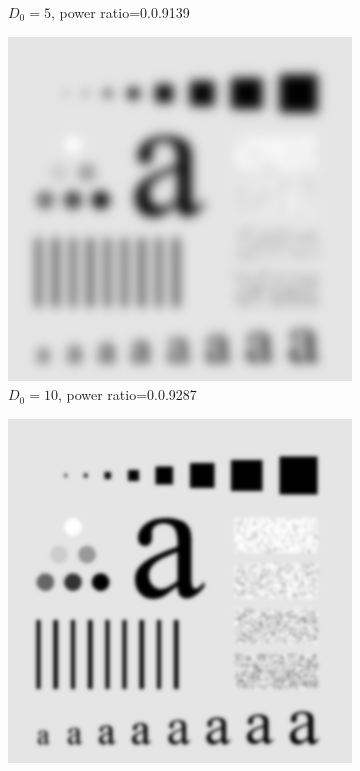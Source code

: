 \begin{figure}[h!]
\begin{subfigure}[b]{0.45\linewidth}
		\caption{$D_0=5$, power ratio=0.0.9139}
		\label{fig:GLPF_5}
	\end{subfigure}
	\begin{subfigure}[b]{0.45\linewidth}
		\includegraphics[width=\linewidth]{myfigure/p3/GLPF_10.png}
		\caption{$D_0=10$, power ratio=0.0.9287}
		\label{fig:GLPF_10}
	\end{subfigure}
	\begin{subfigure}[b]{0.45\linewidth}
		\includegraphics[width=\linewidth]{myfigure/p3/GLPF_30.png}

\end{subfigure}
\end{figure}
